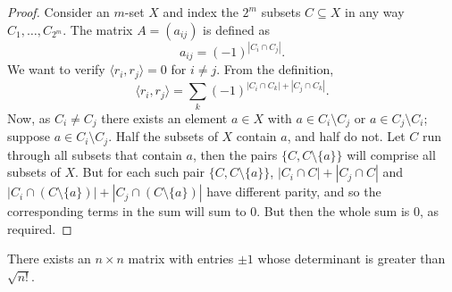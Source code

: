 \begin{proof}
  \leanok
  Consider an $m$-set $X$ and index the $2^m$ subsets $C \subseteq X$ in any way $C_1, \dots, C_{2^m}$. The matrix $A = (a_{ij})$ is defined as
  \[
  a_{ij} = (-1)^{|C_i \cap C_j|}.
  \]
  We want to verify $\langle r_i, r_j \rangle = 0$ for $i \ne j$. From the definition,
  \[
  \langle r_i, r_j \rangle = \sum_k (-1)^{|C_i \cap C_k| + |C_j \cap C_k|}.
  \]
  Now, as $C_i \ne C_j$ there exists an element $a \in X$ with $a \in C_i \setminus C_j$ or $a \in C_j \setminus C_i$;
  suppose $a \in C_i \setminus C_j$.
  Half the subsets of $X$ contain $a$, and half do not.
  Let $C$ run through all subsets that contain $a$, then the pairs $\{C, C \setminus \{a\}\}$ will comprise all subsets of $X$.
  But for each such pair $\{C, C \setminus \{a\}\}$, $|C_i \cap C| + |C_j \cap C|$ and $|C_i \cap (C \setminus \{a\})| + |C_j \cap (C \setminus \{a\})|$ have different parity,
  and so the corresponding terms in the sum will sum to $0$.
  But then the whole sum is $0$, as required.
\end{proof}

\begin{theorem}
  \label{thm:det_greater_n_fact}
  There exists an $n \times n$ matrix with entries $\pm 1$ whose determinant is greater than $\sqrt{n!}$.
\end{theorem}

